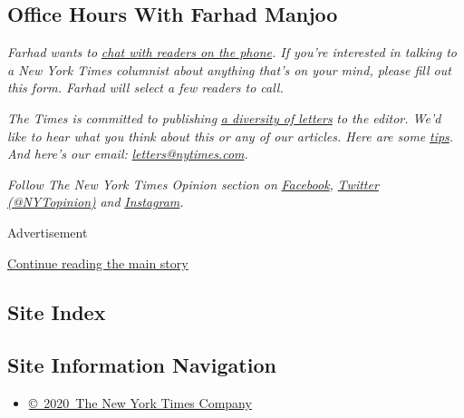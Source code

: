 \hypertarget{office-hours-with-farhad-manjoo}{%
\subsection{Office Hours With Farhad
Manjoo}\label{office-hours-with-farhad-manjoo}}

\emph{Farhad wants to}
\href{https://www.nytimes.com/2019/05/16/opinion/farhad-office-hours.html?module=inline}{\emph{chat
with readers on the phone}}\emph{. If you're interested in talking to a
New York Times columnist about anything that's on your mind, please fill
out this form. Farhad will select a few readers to call.}

\emph{The Times is committed to publishing}
\href{https://www.nytimes.com/2019/01/31/opinion/letters/letters-to-editor-new-york-times-women.html}{\emph{a
diversity of letters}} \emph{to the editor. We'd like to hear what you
think about this or any of our articles. Here are some}
\href{https://help.nytimes.com/hc/en-us/articles/115014925288-How-to-submit-a-letter-to-the-editor}{\emph{tips}}\emph{.
And here's our email:}
\href{mailto:letters@nytimes.com}{\emph{letters@nytimes.com}}\emph{.}

\emph{Follow The New York Times Opinion section on}
\href{https://www.facebook.com/nytopinion}{\emph{Facebook}}\emph{,}
\href{http://twitter.com/NYTOpinion}{\emph{Twitter (@NYTopinion)}}
\emph{and}
\href{https://www.instagram.com/nytopinion/}{\emph{Instagram}}\emph{.}

Advertisement

\protect\hyperlink{after-bottom}{Continue reading the main story}

\hypertarget{site-index}{%
\subsection{Site Index}\label{site-index}}

\hypertarget{site-information-navigation}{%
\subsection{Site Information
Navigation}\label{site-information-navigation}}

\begin{itemize}
\tightlist
\item
  \href{https://help.nytimes.com/hc/en-us/articles/115014792127-Copyright-notice}{©~2020~The
  New York Times Company}
\end{itemize}

